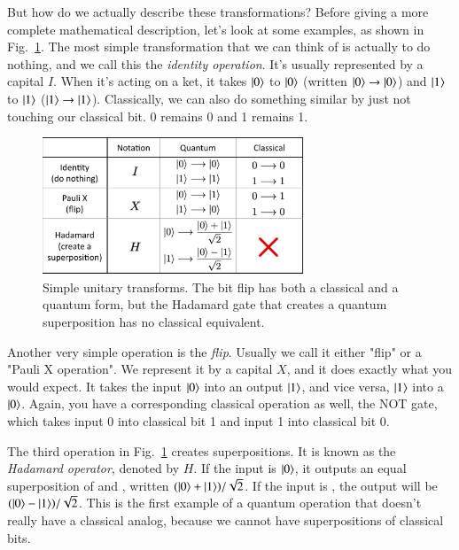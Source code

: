 But how do we actually describe these transformations? Before giving a more complete mathematical description, let's look at some examples, as shown in Fig.~\ref{fig:unitary-table}. The most simple transformation that we can think of is actually to do nothing, and we call this the \emph{identity operation}. It's usually represented by a capital $I$. When it's acting on a ket, it takes $\left| 0 \right\rangle$ to  $\left| 0 \right\rangle$  (written $\left| 0 \right\rangle\rightarrow\left| 0 \right\rangle$) and $\left| 1 \right\rangle$ to $\left| 1 \right\rangle$ ($\left| 1 \right\rangle\rightarrow\left| 1 \right\rangle$). Classically, we can also do something similar by just not touching our classical bit. 0 remains 0 and 1 remains 1.

\begin{figure}[H]
    \centering
    \includegraphics[width=0.7\textwidth]{lesson2/simple_unitary_ops.pdf}
    
        \caption{Simple unitary transforms. The bit flip has both a classical and a quantum form, but the Hadamard gate that creates a quantum superposition has no classical equivalent.}
    
    \label{fig:unitary-table}
\end{figure}

Another very simple operation is the \emph{flip}. Usually we call it either "flip" or a "Pauli X operation". We represent it by a capital $X$, and it does exactly what you would expect. It takes the input $\left| 0 \right\rangle$ into an output $\left| 1 \right\rangle$, and vice versa, $\left| 1 \right\rangle$ into a $\left| 0 \right\rangle$. Again, you have a corresponding classical operation as well, the NOT gate, which takes input 0 into classical bit 1 and input 1 into classical bit 0.

The third operation in Fig.~\ref{fig:unitary-table} creates superpositions. It is known as the \emph{Hadamard operator}, denoted by $H$. If the input is $\left| 0 \right\rangle$, it outputs an equal superposition of  and , written $(\left| 0 \right\rangle+\left| 1 \right\rangle)/\sqrt{2}$. If the input is , the output will be $(\left| 0 \right\rangle-\left| 1 \right\rangle)/\sqrt{2}$. This is the first example of a quantum operation that doesn't really have a classical analog, because we cannot have superpositions of classical bits.

